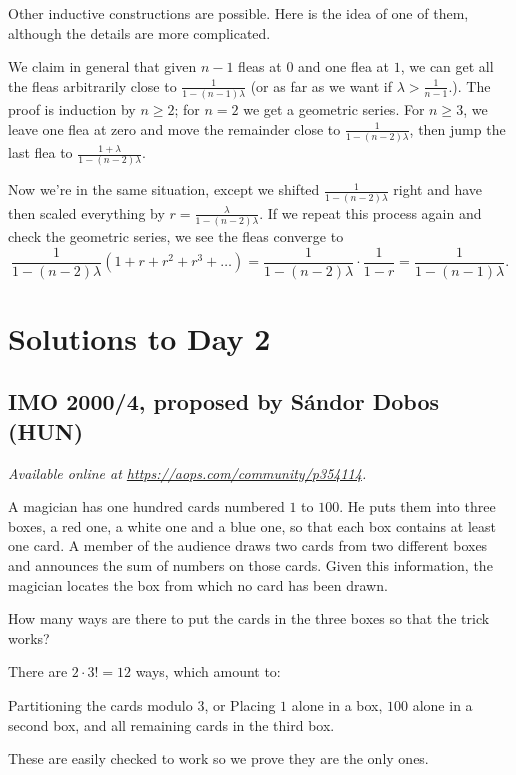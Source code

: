 \documentclass[11pt]{scrartcl}
\begin{document}
\begin{remark*}
  Other inductive constructions are possible.
  Here is the idea of one of them,
  although the details are more complicated.

  We claim in general that given $n-1$ fleas at $0$
  and one flea at $1$,
  we can get all the fleas arbitrarily close to
  $\frac{1}{1-(n-1)\lambda}$
  (or as far as we want if $\lambda > \frac{1}{n-1}$.).
  The proof is induction by $n \ge 2$;
  for $n=2$ we get a geometric series.
  For $n \ge 3$, we leave one flea at zero
  and move the remainder close to $\frac{1}{1-(n-2)\lambda}$,
  then jump the last flea to
  $\frac{1+\lambda}{1-(n-2)\lambda}$.

  Now we're in the same situation,
  except we shifted $\frac{1}{1-(n-2)\lambda}$ right
  and have then scaled everything by
  $r = \frac{\lambda}{1-(n-2)\lambda}$.
  If we repeat this process again and check the geometric series,
  we see the fleas converge to
  \[ \frac{1}{1-(n-2)\lambda}
    \left( 1 + r + r^2 + r^3 + \dots \right)
    = \frac{1}{1-(n-2)\lambda} \cdot \frac{1}{1-r}
    = \frac{1}{1-(n-1)\lambda}. \]
\end{remark*}
\pagebreak

\section{Solutions to Day 2}
\subsection{IMO 2000/4, proposed by Sándor Dobos (HUN)}
\textsl{Available online at \url{https://aops.com/community/p354114}.}
\begin{mdframed}[style=mdpurplebox,frametitle={Problem statement}]
A magician has one hundred cards numbered $1$ to $100$.
He puts them into three boxes, a red one, a white one and a blue one,
so that each box contains at least one card.
A member of the audience draws two cards from two different boxes
and announces the sum of numbers on those cards.
Given this information,
the magician locates the box from which no card has been drawn.

How many ways are there to put the cards
in the three boxes so that the trick works?
\end{mdframed}
There are $2 \cdot 3! = 12$ ways, which amount to:
\begin{itemize}
  \ii Partitioning the cards modulo $3$, or
  \ii Placing $1$ alone in a box,
  $100$ alone in a second box,
  and all remaining cards in the third box.
\end{itemize}
These are easily checked to work so we prove they are the only ones.
\end{document}
